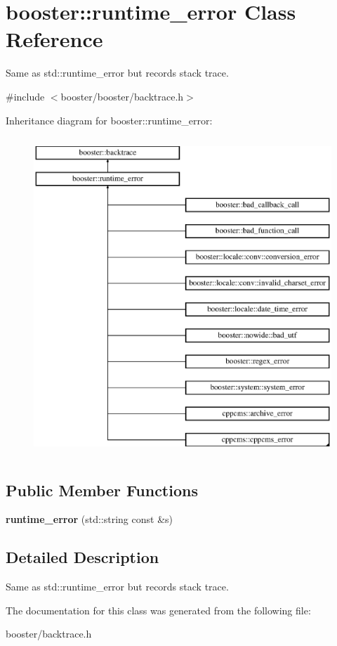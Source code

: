 \section{booster\-:\-:runtime\-\_\-error \-Class \-Reference}
\label{classbooster_1_1runtime__error}


\-Same as std\-::runtime\-\_\-error but records stack trace.  




{\ttfamily \#include $<$booster/booster/backtrace.\-h$>$}

\-Inheritance diagram for booster\-:\-:runtime\-\_\-error\-:\begin{figure}[H]
\begin{center}
\leavevmode
\includegraphics[height=12.000000cm]{classbooster_1_1runtime__error}
\end{center}
\end{figure}
\subsection*{\-Public \-Member \-Functions}
\begin{DoxyCompactItemize}
\item 
{\bfseries runtime\-\_\-error} (std\-::string const \&s)\label{classbooster_1_1runtime__error_a54020944fcbcc8d1a6592900da0d137d}

\end{DoxyCompactItemize}


\subsection{\-Detailed \-Description}
\-Same as std\-::runtime\-\_\-error but records stack trace. 

\-The documentation for this class was generated from the following file\-:\begin{DoxyCompactItemize}
\item 
booster/backtrace.\-h\end{DoxyCompactItemize}
